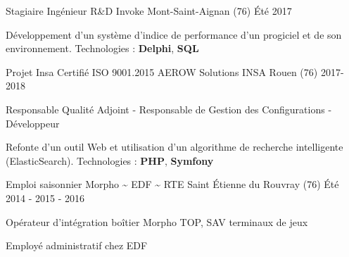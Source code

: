 

\begin{cventries}

\cventry
{Stagiaire Ingénieur R\&D} %
{Invoke} %
{Mont-Saint-Aignan (76)} %
{Été 2017} %
{
	\begin{cvitems} %
		\item {Développement d'un système d'indice de performance d'un progiciel et de son environnement. Technologies : \textbf{Delphi}, \textbf{SQL}}
	\end{cvitems}
}


\cventry
{Projet Insa Certifié ISO 9001.2015} %
{AEROW Solutions} %
{INSA Rouen (76)} %
{2017-2018} %
{
	\begin{cvitems} %
		\item {Responsable Qualité Adjoint - Responsable de Gestion des Configurations - Développeur}
		\item {Refonte d'un outil Web et utilisation d'un algorithme de recherche intelligente (ElasticSearch). Technologies : \textbf{PHP}, \textbf{Symfony}}
	\end{cvitems}
}
	
	\cventry
	{Emploi saisonnier} %
	{Morpho  \textasciitilde{}  EDF  \textasciitilde{}  RTE} %
	{Saint Étienne du Rouvray (76)} %
	{Été 2014 - 2015 - 2016} %
	{
		\begin{cvitems} %
			\item {Opérateur d'intégration boîtier Morpho TOP, SAV terminaux de jeux }
			\item {Employé administratif chez EDF}
		\end{cvitems}
	}



\end{cventries}

